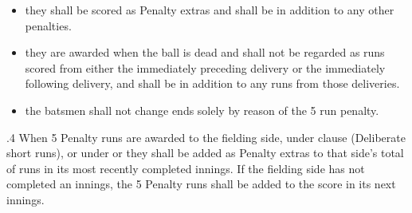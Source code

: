 \documentclass[12pt]{article}
\begin{document}
\vspace{\baselineskip}
\begin{itemize}
	\item {\fontsize{9pt}{10.8pt}\selectfont they shall be scored as Penalty extras and shall be in addition to any other penalties.\par}\par


\vspace{\baselineskip}
	\item {\fontsize{9pt}{10.8pt}\selectfont they are awarded when the ball is dead and shall not be regarded as runs scored from either the immediately preceding delivery or the immediately following delivery, and shall be in addition to any runs from those deliveries.\par}\par


\vspace{\baselineskip}
	\item {\fontsize{9pt}{10.8pt}\selectfont the batsmen shall not change ends solely by reason of the 5 run penalty.\par}
\end{itemize}\par


\vspace{\baselineskip}
\begin{adjustwidth}{0.5in}{0.08in}
{\fontsize{9pt}{10.8pt}.4 When 5 Penalty runs are awarded to the fielding side, under clause (Deliberate short runs), or under or they shall be added as Penalty extras to that side’s total of runs in its most recently completed innings. If the fielding side has not completed an innings, the 5 Penalty runs shall be added to the score in its next innings.\par}\par

\end{adjustwidth}


\vspace{\baselineskip}

\vspace{\baselineskip}

\vspace{\baselineskip}

\vspace{\baselineskip}

\vspace{\baselineskip}

\vspace{\baselineskip}
\end{document}
